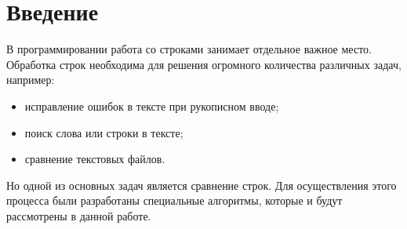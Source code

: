 \chapter*{Введение}

В программировании работа со строками занимает отдельное важное место. Обработка строк необходима для решения огромного количества различных задач, например:
\begin{itemize}
	\item исправление ошибок в тексте при рукописном вводе;
    \item поиск слова или строки в тексте;
    \item сравнение текстовых файлов. \newline
\end{itemize}

Но одной из основных задач является сравнение строк. Для осуществления этого процесса были разработаны специальные алгоритмы, которые и будут рассмотрены в данной работе.\newline

